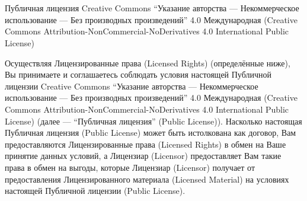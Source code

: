 \chapter*{ }
\markright{}
\label{chapter:license}
\begin{center}\Large
Публичная лицензия Creative Commons ``Указание авторства --- Некоммерческое использование --- Без производных произведений'' 4.0 Международная (Creative Commons Attribution-NonCommercial-NoDerivatives 4.0 International Public License)
\end{center}

\small

Осуществляя Лицензированные права (Licensed Rights) (определённые ниже), Вы принимаете и соглашаетесь соблюдать условия настоящей Публичной лицензии Creative Commons ``Указание авторства --- Некоммерческое использование --- Без производных произведений'' 4.0 Международная (Creative Commons Attribution-NonCommercial-NoDerivatives 4.0 International Public License) (далее --- ``Публичная лицензия'' (Public License)). Насколько настоящая Публичная лицензия (Public License) может быть истолкована как договор, Вам предоставляются Лицензированные права (Licensed Rights) в обмен на Ваше принятие данных условий, а Лицензиар (Licensor) предоставляет Вам такие права в обмен на выгоды, которые Лицензиар (Licensor) получает от предоставления Лицензированного материала (Licensed Material) на условиях настоящей Публичной лицензии (Public License).

